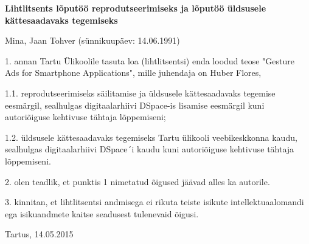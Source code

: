 \textbf{Lihtlitsents l\~{o}put\"{o}\"{o} reprodutseerimiseks ja l\~{o}put\"{o}\"{o} \"{u}ldsusele k\"{a}ttesaadavaks tegemiseks}

\bigskip

Mina, Jaan Tohver (s\"{u}nnikuup\"{a}ev: 14.06.1991)

\bigskip

1. annan Tartu \"{U}likoolile tasuta loa (lihtlitsentsi) enda loodud teose "Gesture Ads for Smartphone Applications", mille juhendaja on Huber Flores,

\bigskip

1.1. reprodutseerimiseks s\"{a}ilitamise ja \"{u}ldsusele k\"{a}ttesaadavaks tegemise eesm\"{a}rgil, sealhulgas digitaalarhiivi DSpace-is lisamise eesm\"{a}rgil kuni autori\~{o}iguse kehtivuse t\"{a}htaja l\~{o}ppemiseni;

\medskip

1.2. \"{u}ldsusele k\"{a}ttesaadavaks tegemiseks Tartu \"{u}likooli veebikeskkonna kaudu, sealhulgas digitaalarhiivi DSpace´i kaudu kuni autori\~{o}iguse kehtivuse t\"{a}htaja l\~{o}ppemiseni.

\bigskip

2. olen teadlik, et punktis 1 nimetatud \~{o}igused j\"{a}\"{a}vad alles ka autorile.

\bigskip

3. kinnitan, et lihtlitsentsi andmisega ei rikuta teiste isikute intellektuaalomandi ega isikuandmete kaitse seadusest tulenevaid \~{o}igusi.

\bigskip

Tartus, 14.05.2015